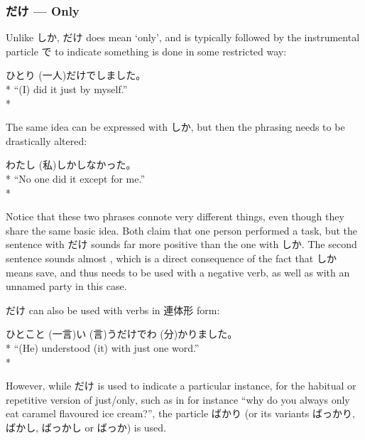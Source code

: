 \documentclass[11pt, b5paper, twoside, openright, onecolumn]{book}
\makeatletter
\newcommand*{\rubystack}[2]{{\relscale{0.5}%
  \begin{tabular}[b]{@{}c@{}}%
    {#1}\\%
   {\textscale{2}{#2}}%
  \end{tabular}}%
}
\DeclareRobustCommand*{\ruby}[2]{%
  \mbox{%
    \setlength{\parskip}{0ex}%
    \BeginAccSupp{method=pdfstringdef,ActualText={#1}}%
      \rubystack{\phantom{#2}}{#1}%
      \llap{%
        \rubystack{#2}{\phantom{#1}}%
      }%
    \EndAccSupp{}%
  }%
}
\renewcommand*{\ruby}[2]{#2 (#1)}%
\newenvironment{exampleblock}{
\setlength{\parindent}{0.6in}
\begin{minipage}[t]{\dimexpr\textwidth-\parindent}}
{\end{minipage}}
\makeatother
\begin{document}
\subsubsection{だけ — Only}


Unlike しか‚ だけ does mean ‘only’‚ and is typically followed by the instrumental particle で to indicate something is done in some restricted way:

\vspace{0.4cm}
\begin{exampleblock}
\ruby{一人}{ひとり}だけでしました。 \\* 
“(I) did it just by myself.” \\* 
\end{exampleblock}
\vspace{0.2cm}

The same idea can be expressed with しか‚ but then the phrasing needs to be drastically altered:

\vspace{0.4cm}
\begin{exampleblock}
\ruby{私}{わたし}しかしなかった。 \\* 
“No one did it except for me.” \\* 
\end{exampleblock}
\vspace{0.2cm}

Notice that these two phrases connote very different things‚ even though they share the same basic idea. Both claim that one person performed a task‚ but the sentence with だけ sounds far more positive than the one with しか. The second sentence sounds almost ‚ which is a direct consequence of the fact that しか means save‚ and thus needs to be used with a negative verb‚ as well as with an unnamed party in this case.

だけ can also be used with verbs in 連体形 form:

\vspace{0.4cm}
\begin{exampleblock}
\ruby{一言}{ひとこと}\ruby{言}{い}うだけで\ruby{分}{わ}かりました。 \\* 
“(He) understood (it) with just one word.” \\* 
\end{exampleblock}
\vspace{0.2cm}

However‚ while だけ is used to indicate a particular instance‚ for the habitual or repetitive version of just/only‚ such as in for instance “why do you always only eat caramel flavoured ice cream?”‚ the particle ばかり (or its variants ばっかり‚ ばかし‚ ばっかし or ばっか) is used.
\end{document}
